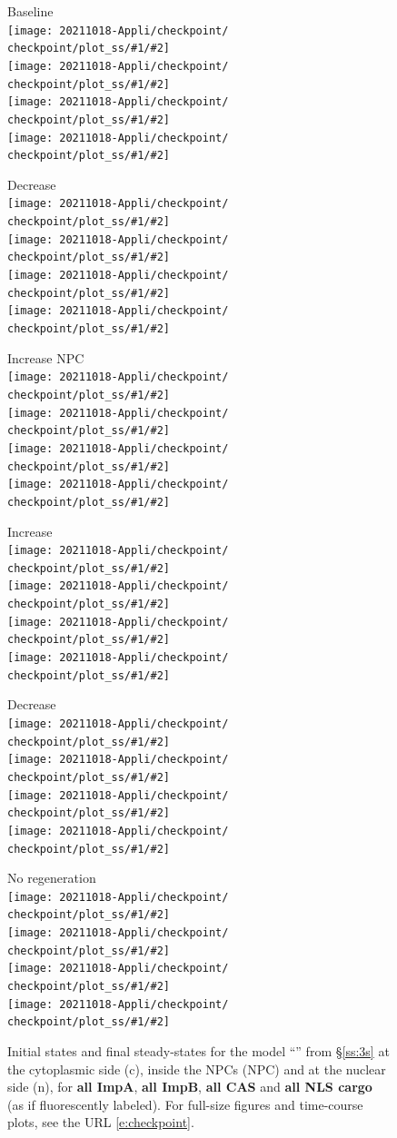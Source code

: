 \documentclass[12pt,notitlepage]{article}
\def\[#1\]{\begin{align}#1\end{align}}
\begin{document}
\clearpage %

\begin{figure}[!h]
	\centering
	
	\vspace{-1\baselineskip}
	
	\newcommand{\fig}[2]{%
		\texttt{[image: 20211018-Appli/checkpoint/\\checkpoint/plot\_ss/\#1/\#2]}%
	}
	\newcommand{\figures}[1]{\fig{#1}{All ImpA}\\\fig{#1}{All ImpB}\\\fig{#1}{All CAS}\\\fig{#1}{All NLS}}
	
	\begin{minipage}{0.32\textwidth}
		\centering
		Baseline \\[0.5\baselineskip]
		\figures{a_Baseline}
	\end{minipage}
	\hfill
	\begin{minipage}{0.32\textwidth}
		\centering
		Decrease  \\[0.5\baselineskip]
		\figures{b_LowImpB}
	\end{minipage}
	\hfill
	\begin{minipage}{0.32\textwidth}
		\centering
		Increase NPC \\[0.5\baselineskip]
		\figures{c_MoreNPC}
	\end{minipage}

	\vspace{\baselineskip}

	\begin{minipage}{0.32\textwidth}
		\centering
		Increase  \\[0.5\baselineskip]
		\figures{d_HighImpA}
	\end{minipage}
	\hfill
	\begin{minipage}{0.32\textwidth}
		\centering
		Decrease  \\[0.5\baselineskip]
		\figures{d_LowImpA}
	\end{minipage}
	\hfill
	\begin{minipage}{0.32\textwidth}
		\centering
		No  regeneration \\[0.5\baselineskip]
		\figures{e_NoEnergy}
	\end{minipage}
	
	\vspace{\baselineskip}
		
	\caption{%
		Initial states and final steady-states for the model 
		``'' from \S\ref{ss:3s}
		at the cytoplasmic side (c),
		inside the NPCs (NPC)
		and 
		at the nuclear side (n),
		for 
		\textbf{all ImpA},
		\textbf{all ImpB},
		\textbf{all CAS}
		and
		\textbf{all NLS cargo}
		(as if fluorescently labeled).
		For full-size figures and time-course plots, see the URL \eqref{e:checkpoint}.
	}
	\label{f:app:3s-plot2-ss}
\end{figure}
\end{document}
